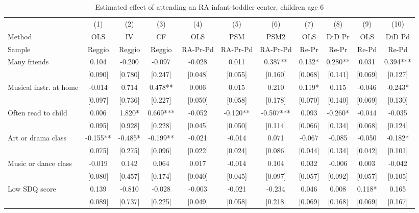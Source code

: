 \documentclass[12pt]{article}
\begin{document}
\begin{table}[ht]
\caption{Estimated effect of attending an RA infant-toddler center, children
age 6}
\label{tab:childIT}
\begin{center}
\begin{adjustbox}{width=1.2\textwidth,center=\textwidth}
\small
\begin{tabular}{l*{10}{c}}
\hline\hline
& (1) & (2) & (3) & (4) & (5) & (6) & (7) & (8) & (9) & (10) \\ 
Method & OLS & IV & CF & OLS & PSM & PSM2 & OLS & DiD Pr & OLS & DiD Pd \\
Sample & Reggio & Reggio & Reggio & RA-Pr-Pd & RA-Pr-Pd & RA-Pr-Pd & Re-Pr & Re-Pr & Re-Pd & Re-Pd \\
\hline
Many friends  & 0.104 & -0.200 & -0.097 & -0.028 & 0.011 & 0.387** & 0.132* & 0.280** & 0.031 & 0.394*** \\
 & [0.090] & [0.780] & [0.247] & [0.048] & [0.055] & [0.160] & [0.068] & [0.141] & [0.069] & [0.127] \\
Musical instr. at home & -0.014 & 0.714 & 0.478** & 0.006 & 0.015 & 0.210 & 0.119* & 0.115 & -0.046 & -0.243* \\
 & [0.097] & [0.736] & [0.227] & [0.050] & [0.058] & [0.178] & [0.070] & [0.140] & [0.069] & [0.130] \\
Often read to child
 & 0.006 & 1.820* & 0.669*** & -0.052 & -0.120** & -0.507*** & 0.093 & -0.260* & -0.044 & -0.035 \\
 & [0.095] & [0.928] & [0.228] & [0.045] & [0.050] & [0.114] & [0.066] & [0.134] & [0.068] & [0.124] \\
Art or drama class  & -0.155** & -0.485* & -0.199** & -0.021 & -0.014 & 0.071 & -0.067 & -0.085 & -0.050 & -0.182* \\
 & [0.075] & [0.275] & [0.096] & [0.022] & [0.024] & [0.086] & [0.044] & [0.134] & [0.042] & [0.101] \\
Music or dance class  & -0.019 & 0.142 & 0.064 & 0.017 & -0.014 & 0.104 & 0.032 & -0.006 & 0.003 & -0.042 \\
 & [0.080] & [0.457] & [0.174] & [0.040] & [0.045] & [0.097] & [0.057] & [0.092] & [0.057] & [0.105] \\
Low SDQ score  & 0.139 & -0.810 & -0.028 & -0.003 & -0.021 & -0.234 & 0.046 & 0.008 & 0.118* & 0.165 \\
 & [0.089] & [0.737] & [0.225] & [0.049] & [0.058] & [0.218] & [0.069] & [0.168] & [0.069] & [0.167] \\

\end{tabular}
\end{adjustbox}
\end{center}
\end{table}
\end{document}
